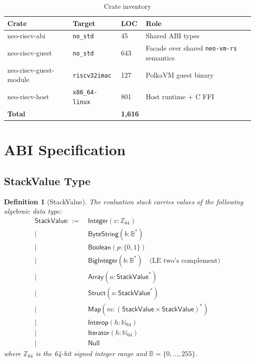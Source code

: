 \documentclass[11pt,a4paper]{article}
\newtheorem{definition}{Definition}[section]
\begin{document}
\begin{table}[h]
\centering
\begin{tabular}{@{}llll@{}}
\toprule
\textbf{Crate} & \textbf{Target} & \textbf{LOC} & \textbf{Role} \\
\midrule
neo-riscv-abi & \texttt{no\_std} & 45 & Shared ABI types \\
neo-riscv-guest & \texttt{no\_std} & 643 & Facade over shared \texttt{neo-vm-rs} semantics \\
neo-riscv-guest-module & \texttt{riscv32imac} & 127 & PolkaVM guest binary \\
neo-riscv-host & \texttt{x86\_64-linux} & 801 & Host runtime + C FFI \\
\midrule
\textbf{Total} & & \textbf{1,616} & \\
\bottomrule
\end{tabular}
\caption{Crate inventory}
\label{tab:crates}
\end{table}

\section{ABI Specification}

\subsection{StackValue Type}

\begin{definition}[StackValue]
The evaluation stack carries values of the following algebraic data type:
\begin{align*}
\mathsf{StackValue} ::=&\ \mathsf{Integer}(v : \mathbb{Z}_{64}) \\
|&\ \mathsf{ByteString}(b : \mathbb{B}^*) \\
|&\ \mathsf{Boolean}(p : \{0,1\}) \\
|&\ \mathsf{BigInteger}(b : \mathbb{B}^*) \quad \text{(LE two's complement)} \\
|&\ \mathsf{Array}(a : \mathsf{StackValue}^*) \\
|&\ \mathsf{Struct}(s : \mathsf{StackValue}^*) \\
|&\ \mathsf{Map}(m : (\mathsf{StackValue} \times \mathsf{StackValue})^*) \\
|&\ \mathsf{Interop}(h : \mathbb{N}_{64}) \\
|&\ \mathsf{Iterator}(h : \mathbb{N}_{64}) \\
|&\ \mathsf{Null}
\end{align*}
where $\mathbb{Z}_{64}$ is the 64-bit signed integer range and $\mathbb{B} = \{0,\ldots,255\}$.
\end{definition}
\end{document}

